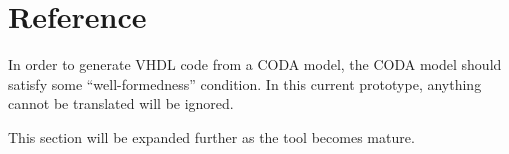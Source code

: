 \section{Reference}
\label{sec:vhdl-reference}

In order to generate VHDL code from a CODA model, the CODA model should satisfy some ``well-formedness'' condition. In this current prototype, anything cannot be translated will be ignored.

This section will be expanded further as the tool becomes mature.

